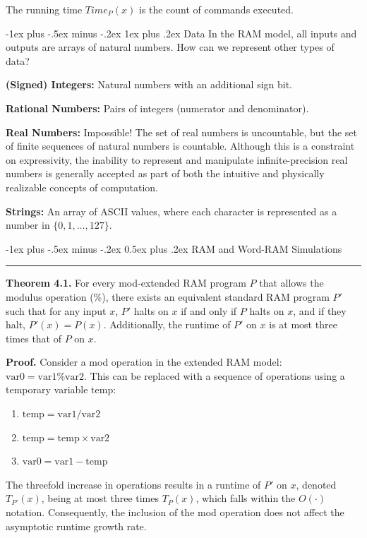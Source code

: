 \documentclass[10pt,landscape]{article}
\makeatletter
\renewcommand{\section}{\@startsection{section}{1}{0mm}%
                                {-1ex plus -.5ex minus -.2ex}%
                                {0.5ex plus .2ex}%
                                {\normalfont\large\bfseries}}
\renewcommand{\subsubsection}{\@startsection{subsubsection}{3}{0mm}%
                                {-1ex plus -.5ex minus -.2ex}%
                                {1ex plus .2ex}%
                                {\normalfont\small\bfseries}}
\makeatother
\begin{document}
\begin{multicols*}{3}
The running time \( Time_P(x) \) is the count of commands executed.


\subsubsection{Data}
In the RAM model, all inputs and outputs are arrays of natural numbers. How can we represent other types of data?


\textbf{(Signed) Integers:} Natural numbers with an additional sign bit.


\textbf{Rational Numbers:} Pairs of integers (numerator and denominator).


\textbf{Real Numbers:} Impossible! The set of real numbers is uncountable, but the set of finite sequences of natural numbers is countable. Although this is a constraint on expressivity, the inability to represent and manipulate infinite-precision real numbers is generally accepted as part of both the intuitive and physically realizable concepts of computation.


\textbf{Strings:} An array of ASCII values, where each character is represented as a number in $\{0, 1, \ldots, 127\}$.


\section{RAM and Word-RAM Simulations}\smallskip \hrule height 2pt \smallskip

\textbf{Theorem 4.1.}
For every mod-extended RAM program \( P \) that allows the modulus operation (\%), there exists an equivalent standard RAM program \( P' \) such that for any input \( x \), \( P' \) halts on \( x \) if and only if \( P \) halts on \( x \), and if they halt, \( P'(x) = P(x) \). Additionally, the runtime of \( P' \) on \( x \) is at most three times that of \( P \) on \( x \).

\textbf{Proof.}
Consider a mod operation in the extended RAM model: \( \text{var0} = \text{var1}\% \text{var2} \). This can be replaced with a sequence of operations using a temporary variable \( \text{temp} \):
\begin{enumerate}
    \item \( \text{temp} = \text{var1} / \text{var2} \)
    \item \( \text{temp} = \text{temp} \times \text{var2} \)
    \item \( \text{var0} = \text{var1} - \text{temp} \)
\end{enumerate}
The threefold increase in operations results in a runtime of \( P' \) on \( x \), denoted \( T_{P'}(x) \), being at most three times \( T_{P}(x) \), which falls within the \( O(\cdot) \) notation. Consequently, the inclusion of the mod operation does not affect the asymptotic runtime growth rate.


\end{multicols*}
\end{document}
